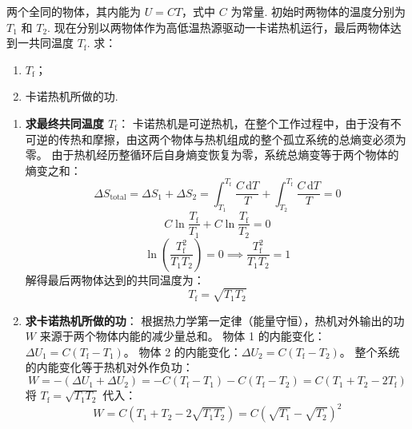 \begin{exercise}\label{ex:12.4}
两个全同的物体，其内能为 $U = CT$，式中 $C$ 为常量. 初始时两物体的温度分别为 $T_1$ 和 $T_2$. 现在分别以两物体作为高低温热源驱动一卡诺热机运行，最后两物体达到一共同温度 $T_{\mathrm{f}}$. 求：
\begin{enumerate}
  \item[(a)] $T_{\mathrm{f}}$；
  \item[(b)] 卡诺热机所做的功.
\end{enumerate}
\end{exercise}
\begin{solution}
\begin{enumerate}
    \item[(a)] \textbf{求最终共同温度 $T_{\mathrm{f}}$}：
    卡诺热机是可逆热机，在整个工作过程中，由于没有不可逆的传热和摩擦，由这两个物体与热机组成的整个孤立系统的总熵变必须为零。
    由于热机经历整循环后自身熵变恢复为零，系统总熵变等于两个物体的熵变之和：
    $$ \Delta S_{\mathrm{total}} = \Delta S_1 + \Delta S_2 = \int_{T_1}^{T_{\mathrm{f}}} \frac{C \, \mathrm{d}T}{T} + \int_{T_2}^{T_{\mathrm{f}}} \frac{C \, \mathrm{d}T}{T} = 0 $$
    $$ C \ln\frac{T_{\mathrm{f}}}{T_1} + C \ln\frac{T_{\mathrm{f}}}{T_2} = 0 $$
    $$ \ln\left( \frac{T_{\mathrm{f}}^2}{T_1 T_2} \right) = 0 \implies \frac{T_{\mathrm{f}}^2}{T_1 T_2} = 1 $$
    解得最后两物体达到的共同温度为：
    $$ T_{\mathrm{f}} = \sqrt{T_1 T_2} $$

    \item[(b)] \textbf{求卡诺热机所做的功}：
    根据热力学第一定律（能量守恒），热机对外输出的功 $W$ 来源于两个物体内能的减少量总和。
    物体 1 的内能变化：$\Delta U_1 = C(T_{\mathrm{f}} - T_1)$。
    物体 2 的内能变化：$\Delta U_2 = C(T_{\mathrm{f}} - T_2)$。
    整个系统的内能变化等于热机对外作负功：
    $$ W = -(\Delta U_1 + \Delta U_2) = -C(T_{\mathrm{f}} - T_1) - C(T_{\mathrm{f}} - T_2) = C(T_1 + T_2 - 2T_{\mathrm{f}}) $$
    将 $T_{\mathrm{f}} = \sqrt{T_1 T_2}$ 代入：
    $$ W = C(T_1 + T_2 - 2\sqrt{T_1 T_2}) = C(\sqrt{T_1} - \sqrt{T_2})^2 $$
\end{enumerate}
\end{solution}

